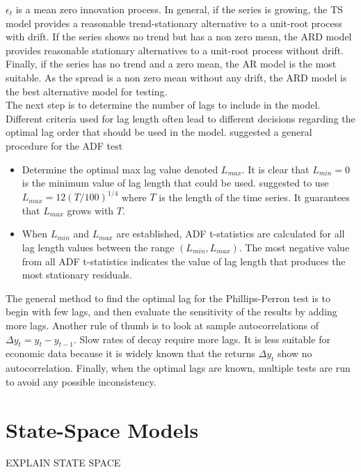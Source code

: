 \documentclass[11pt,a4,twosided,singlespacing,titlepagenumber=on]{scrreprt}
\numberwithin{equation}{chapter} %
\theoremstyle{remark}
\begin{document}
$\epsilon_t$ is a mean zero innovation process. In general, if the series is growing, the TS model provides a reasonable trend-stationary alternative to a unit-root process with drift. If the series shows no trend but has a non zero mean, the ARD model provides reasonable stationary alternatives to a unit-root process without drift. Finally, if the series has no trend and a zero mean, the AR model is the most suitable. As the spread is a non zero mean without any drift, the ARD model is the best alternative model for testing. \\

The next step is to determine the number of lags to include in the model. Different criteria used for lag length often lead to different decisions regarding the optimal lag order that should be used in the model. \cite{daoimpact} suggested a general procedure for the ADF test
\begin{itemize}
\item Determine the optimal max lag value denoted $L_{max}$. It is clear that $L_{min} = 0$ is the minimum value of lag length that could be used. \cite{schwert2002} suggested to use $L_{max} = 12 \left(T / 100 \right)^{1/4}$ where $T$ is the length of the time series. It guarantees that $L_{max}$ grows with $T$.
\item When $L_{min}$ and $L_{max}$ are established, ADF t-statistics are calculated for all lag length values between the range $(L_{min}, L_{max})$. The most negative value from all ADF t-statistics indicates the value of lag length that produces the most stationary residuals.
\end{itemize}
The general method to find the optimal lag for the Phillips-Perron test is to begin with few lags, and then evaluate the sensitivity of the results by adding more lags. Another rule of thumb is to look at sample autocorrelations of $\Delta y_t = y_t - y_{t-1}$. Slow rates of decay require more lags. It is less suitable for economic data because it is widely known that the returns $\Delta y_t$ show no autocorrelation. Finally, when the optimal lags are known, multiple tests are run to avoid any possible inconsistency.

\chapter{State-Space Models}
EXPLAIN STATE SPACE
\end{document}
